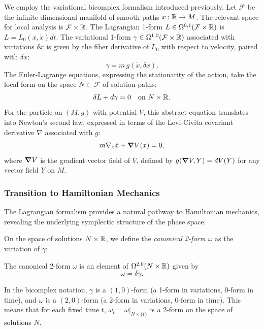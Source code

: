 We employ the variational bicomplex formalism introduced previously. Let $\mathcal{F}$ be the infinite-dimensional manifold of smooth paths $x: \mathbb{R} \to M$. The relevant space for local analysis is $\mathcal{F} \times \mathbb{R}$.
The Lagrangian 1-form $L \in \Omega^{0,1}(\mathcal{F} \times \mathbb{R})$ is $L = L_0(x,\dot{x}) dt$.
The variational 1-form $\gamma \in \Omega^{1,0}(\mathcal{F} \times \mathbb{R})$ associated with variations $\delta x$ is given by the fiber derivative of $L_0$ with respect to velocity, paired with $\delta x$:
\begin{equation}
    \gamma = m \, g(\dot{x}, \delta x).
\end{equation}
The Euler-Lagrange equations, expressing the stationarity of the action, take the local form on the space $N \subset \mathcal{F}$ of solution paths:
\begin{equation}
\label{eq:EL_form_lagrangian}
    \delta L + d\gamma = 0 \quad \text{on } N \times \mathbb{R}.
\end{equation}
For the particle on $(M,g)$ with potential $V$, this abstract equation translates into Newton's second law, expressed in terms of the Levi-Civita covariant derivative $\nabla$ associated with $g$:
\begin{equation}
\label{eq:newtons_law_manifold}
    m \nabla_{\dot{x}}\dot{x} + \grad V(x) = 0,
\end{equation}
where $\grad V$ is the gradient vector field of $V$, defined by $g(\grad V, Y) = dV(Y)$ for any vector field $Y$ on $M$.

\subsubsection{Transition to Hamiltonian Mechanics}
The Lagrangian formalism provides a natural pathway to Hamiltonian mechanics, revealing the underlying symplectic structure of the phase space.

On the space of solutions $N \times \mathbb{R}$, we define the \textit{canonical 2-form} $\omega$ as the variation of $\gamma$:
\begin{definition}
The canonical 2-form $\omega$ is an element of $\Omega^{2,0}(N \times \mathbb{R})$ given by
\begin{equation}
    \omega = \delta \gamma.
\end{equation}
\end{definition}
In the bicomplex notation, $\gamma$ is a $(1,0)$-form (a 1-form in variations, 0-form in time), and $\omega$ is a $(2,0)$-form (a 2-form in variations, 0-form in time). This means that for each fixed time $t$, $\omega_t = \omega|_{N \times \{t\}}$ is a 2-form on the space of solutions $N$.

